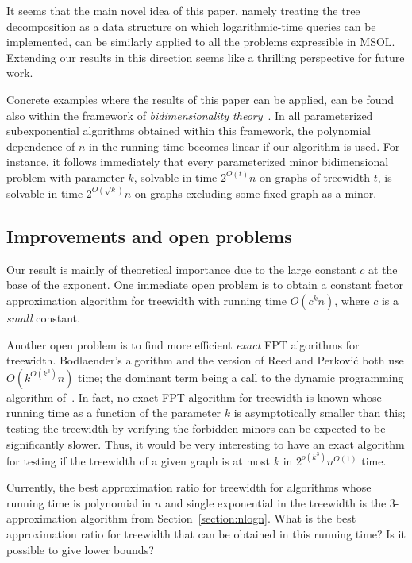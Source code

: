 \documentclass[a4paper,11pt]{article}
\theoremstyle{definition}
\theoremstyle{remark}
\begin{document}
It seems that the main novel idea of this paper, namely treating the
tree decomposition as a data structure on which logarithmic-time
queries can be implemented, can be similarly applied to all the
problems expressible in MSOL.  Extending our results in this direction
seems like a thrilling perspective for future work.

Concrete examples where the results of this paper can be applied, can
be found also within the framework of \emph{bidimensionality
  theory}~\cite{DemaineFHT05a, DemaineH08}.  In all parameterized
subexponential algorithms obtained within this framework, the
polynomial dependence of $n$ in the running time becomes linear if our
algorithm is used.  For instance, it follows immediately that every
parameterized minor bidimensional problem with parameter $k$, solvable
in time $2^{O(t)}n$ on graphs of treewidth $t$, is solvable in time
$2^{O(\sqrt{k})}n$ on graphs excluding some fixed graph as a minor.


\subsection{Improvements and open problems}
Our result is mainly of theoretical importance due to the large
constant $c$ at the base of the exponent.  One immediate open problem
is to obtain a constant factor approximation algorithm for treewidth
with running time $O(c^k n)$, where $c$ is a \emph{small} constant.

Another open problem is to find more efficient \emph{exact} FPT
algorithms for treewidth.  Bodlaender's algorithm \cite{Bodlaender96}
and the version of Reed and Perkovi{\'{c}} both use $O(k^{O(k^3)}n)$
time; the dominant term being a call to the dynamic programming
algorithm of~\cite{BodlaenderK96}.  In fact, no exact FPT algorithm
for treewidth is known whose running time as a function of the
parameter $k$ is asymptotically smaller than this; testing the
treewidth by verifying the forbidden minors can be expected to be
significantly slower.  Thus, it would be very interesting to have an
exact algorithm for testing if the treewidth of a given graph is at
most $k$ in $2^{o(k^3)} n^{O(1)}$ time.

Currently, the best approximation ratio for treewidth for algorithms
whose running time is polynomial in $n$ and single exponential in the
treewidth is the 3-approximation algorithm from
Section~\ref{section:nlogn}.  What is the best approximation ratio for
treewidth that can be obtained in this running time? Is it possible to
give lower bounds?
\end{document}
